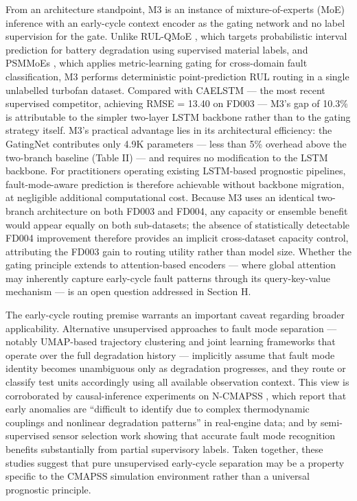 \documentclass[review,12pt]{elsarticle}
\begin{document}
From an architecture standpoint, M3 is an instance of mixture-of-experts (MoE) inference \cite{ref32,ref43,ref44} with an early-cycle context encoder as the gating network and no label supervision for the gate. Unlike RUL-QMoE \cite{ref43}, which targets probabilistic interval prediction for battery degradation using supervised material labels, and PSMMoEs \cite{ref44}, which applies metric-learning gating for cross-domain fault classification, M3 performs deterministic point-prediction RUL routing in a single unlabelled turbofan dataset. Compared with CAELSTM \cite{ref15} — the most recent supervised competitor, achieving RMSE = 13.40 on FD003 — M3's gap of 10.3\% is attributable to the simpler two-layer LSTM backbone rather than to the gating strategy itself. M3's practical advantage lies in its architectural efficiency: the GatingNet contributes only 4.9K parameters — less than 5\% overhead above the two-branch baseline (Table II) — and requires no modification to the LSTM backbone. For practitioners operating existing LSTM-based prognostic pipelines, fault-mode-aware prediction is therefore achievable without backbone migration, at negligible additional computational cost. Because M3 uses an identical two-branch architecture on both FD003 and FD004, any capacity or ensemble benefit would appear equally on both sub-datasets; the absence of statistically detectable FD004 improvement therefore provides an implicit cross-dataset capacity control, attributing the FD003 gain to routing utility rather than model size. Whether the gating principle extends to attention-based encoders \cite{ref08,ref13,ref14} — where global attention may inherently capture early-cycle fault patterns through its query-key-value mechanism — is an open question addressed in Section H.

The early-cycle routing premise warrants an important caveat regarding broader applicability. Alternative unsupervised approaches to fault mode separation — notably UMAP-based trajectory clustering \cite{ref46} and joint learning frameworks that operate over the full degradation history \cite{ref47} — implicitly assume that fault mode identity becomes unambiguous only as degradation progresses, and they route or classify test units accordingly using all available observation context. This view is corroborated by causal-inference experiments on N-CMAPSS \cite{ref48}, which report that early anomalies are ``difficult to identify due to complex thermodynamic couplings and nonlinear degradation patterns'' in real-engine data; and by semi-supervised sensor selection work \cite{ref49} showing that accurate fault mode recognition benefits substantially from partial supervisory labels. Taken together, these studies suggest that pure unsupervised early-cycle separation may be a property specific to the CMAPSS simulation environment rather than a universal prognostic principle.
\end{document}
